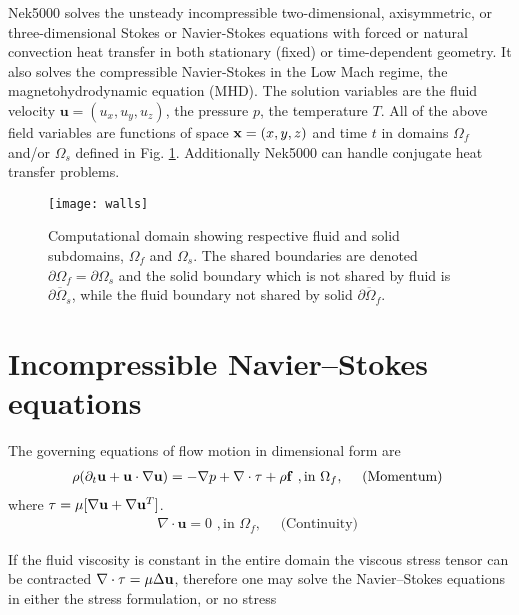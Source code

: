 Nek5000 solves the unsteady incompressible two-dimensional,
axisymmetric, or three-dimensional Stokes or Navier-Stokes
equations with forced or natural convection heat transfer in
both stationary (fixed) or time-dependent geometry. It also solves the compressible Navier-Stokes in the Low Mach regime, the magnetohydrodynamic equation (MHD).
The solution variables are the fluid velocity
\(\mathbf u=(u_{x},u_{y},u_{z})\), the pressure \(p\),
the temperature \(T\). 
All of the above field variables
are functions of space \({\bf x}=(x,y,z)\) and time \(t\)
in domains \(\Omega_f\) and/or \(\Omega_s\) defined in Fig. \ref{fig:domains}.
Additionally Nek5000 can handle conjugate heat transfer problems.

\begin{figure}
\centering
\texttt{[image: walls]}
\caption{Computational domain showing respective fluid
and solid subdomains, \(\Omega_f\) and \(\Omega_s\). The shared boundaries are denoted \(\partial\Omega_f=\partial\Omega_s\) and the solid boundary which is not shared by fluid is \(\overline{\partial\Omega_s}\), while the fluid boundary not shared by solid \(\overline{\partial\Omega_f}\).}
\label{fig:domains}
\end{figure}

\section{Incompressible Navier--Stokes equations}
%
The governing equations of flow motion in dimensional form are
\begin{eqnarray}\label{eq:ns_momentum}
\rho(\partial_{t} \mathbf u +\mathbf u \cdot \nabla \mathbf u) = - \nabla p + \nabla \cdot \tau + \rho {\bf f} \,\, , \text{in } \Omega_f , \quad \text{  (Momentum)  } 
\end{eqnarray}
where \( \tau=\mu[\nabla \mathbf{u}+\nabla \mathbf{u}^{T}]\).
\begin{eqnarray}\label{eq:ns_cont}
 \nabla \cdot \mathbf u =0 \,\, , \text{in } \Omega_f, \quad \text{  (Continuity)  }   
\end{eqnarray}

If the fluid viscosity is constant in the entire domain the viscous stress tensor can be contracted \(\nabla\cdot\tau=\mu\Delta \mathbf{u}\), therefore one may solve the Navier--Stokes equations in either the stress formulation, or no stress

